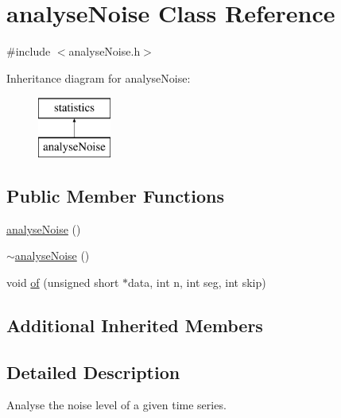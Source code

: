 \hypertarget{classanalyseNoise}{\section{analyse\-Noise Class Reference}
\label{classanalyseNoise}
}


{\ttfamily \#include $<$analyse\-Noise.\-h$>$}

Inheritance diagram for analyse\-Noise\-:\begin{figure}[H]
\begin{center}
\leavevmode
\includegraphics[height=2.000000cm]{classanalyseNoise}
\end{center}
\end{figure}
\subsection*{Public Member Functions}
\begin{DoxyCompactItemize}
\item 
\hyperlink{classanalyseNoise_a3aa97ee9192d62ed488b8942ef0b8acf}{analyse\-Noise} ()
\item 
\hyperlink{classanalyseNoise_ac9f74d3e07f31186904ad86593c8795f}{$\sim$analyse\-Noise} ()
\item 
void \hyperlink{classanalyseNoise_a0daed443334defb0b7262457cb7d7176}{of} (unsigned short $\ast$data, int n, int seg, int skip)
\end{DoxyCompactItemize}
\subsection*{Additional Inherited Members}


\subsection{Detailed Description}
Analyse the noise level of a given time series. 

